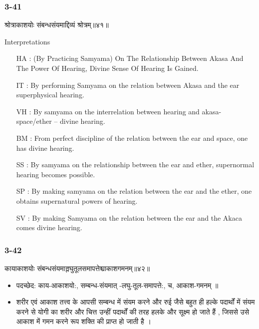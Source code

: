 \begin{frame}[fragile]\frametitle{3-41}
\begin{sanskrit}
श्रोत्राकाशयोः संबन्धसंयमाद्दिव्यं श्रोत्रम्॥४१॥
\end{sanskrit}

Interpretations
\begin{itemize}	
\item [HA]: (By Practicing Samyama) On The Relationship Between Akasa And The Power Of Hearing, Divine Sense Of Hearing Is Gained.
\item [IT]: By performing Samyama on the relation between Akasa and the ear superphysical hearing.
\item [VH]: By samyama on the interrelation between hearing and akasa- space/ether – divine hearing.
\item [BM]: From perfect discipline of the relation between the ear and space, one has divine hearing.
\item [SS]: By samyama on the relationship between the ear and ether, supernormal hearing becomes possible.
\item [SP]: By making samyama on the relation between the ear and the ether, one obtains supernatural powers of hearing.
\item [SV]: By making Samyama on the relation between the ear and the Akaca comes divine hearing.
\end{itemize}
\end{frame}


\begin{frame}[fragile]\frametitle{3-42}
\begin{sanskrit}
कायाकाशयोः संबन्धसंयमाल्लघुतूलसमापत्तेश्चाकाशगमनम्॥४२॥
\end{sanskrit}

\begin{itemize}
\item पदच्छेद:  काय-आकाशयो:, सम्बन्ध-‌संयमात् -लघु-तूल-समापत्ते:, च, आकाश-गमनम् ॥
\item शरीर एवं आकाश तत्त्व के आपसी सम्बन्ध में संयम करने और रुई जैसे बहुत ही हल्के पदार्थों में संयम करने से योगी का शरीर और चित्त उन्हीं पदार्थों की तरह हलके और सूक्ष्म हो जाते हैं , जिससे उसे आकाश में गमन करने  रूप शक्ति की प्राप्त हो जाती है ।
\end{itemize}
\end{frame}

